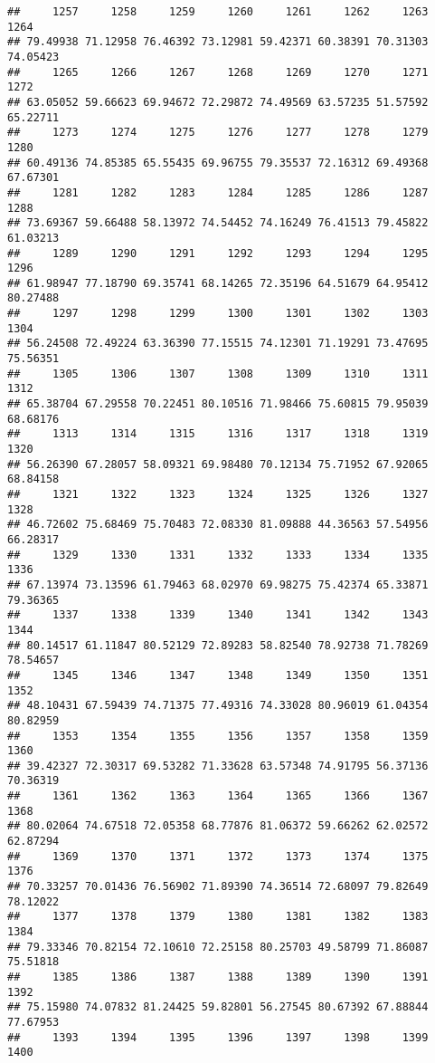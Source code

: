 \documentclass[
]{article}
\begin{document}
\begin{verbatim}
##     1257     1258     1259     1260     1261     1262     1263     1264 
## 79.49938 71.12958 76.46392 73.12981 59.42371 60.38391 70.31303 74.05423 
##     1265     1266     1267     1268     1269     1270     1271     1272 
## 63.05052 59.66623 69.94672 72.29872 74.49569 63.57235 51.57592 65.22711 
##     1273     1274     1275     1276     1277     1278     1279     1280 
## 60.49136 74.85385 65.55435 69.96755 79.35537 72.16312 69.49368 67.67301 
##     1281     1282     1283     1284     1285     1286     1287     1288 
## 73.69367 59.66488 58.13972 74.54452 74.16249 76.41513 79.45822 61.03213 
##     1289     1290     1291     1292     1293     1294     1295     1296 
## 61.98947 77.18790 69.35741 68.14265 72.35196 64.51679 64.95412 80.27488 
##     1297     1298     1299     1300     1301     1302     1303     1304 
## 56.24508 72.49224 63.36390 77.15515 74.12301 71.19291 73.47695 75.56351 
##     1305     1306     1307     1308     1309     1310     1311     1312 
## 65.38704 67.29558 70.22451 80.10516 71.98466 75.60815 79.95039 68.68176 
##     1313     1314     1315     1316     1317     1318     1319     1320 
## 56.26390 67.28057 58.09321 69.98480 70.12134 75.71952 67.92065 68.84158 
##     1321     1322     1323     1324     1325     1326     1327     1328 
## 46.72602 75.68469 75.70483 72.08330 81.09888 44.36563 57.54956 66.28317 
##     1329     1330     1331     1332     1333     1334     1335     1336 
## 67.13974 73.13596 61.79463 68.02970 69.98275 75.42374 65.33871 79.36365 
##     1337     1338     1339     1340     1341     1342     1343     1344 
## 80.14517 61.11847 80.52129 72.89283 58.82540 78.92738 71.78269 78.54657 
##     1345     1346     1347     1348     1349     1350     1351     1352 
## 48.10431 67.59439 74.71375 77.49316 74.33028 80.96019 61.04354 80.82959 
##     1353     1354     1355     1356     1357     1358     1359     1360 
## 39.42327 72.30317 69.53282 71.33628 63.57348 74.91795 56.37136 70.36319 
##     1361     1362     1363     1364     1365     1366     1367     1368 
## 80.02064 74.67518 72.05358 68.77876 81.06372 59.66262 62.02572 62.87294 
##     1369     1370     1371     1372     1373     1374     1375     1376 
## 70.33257 70.01436 76.56902 71.89390 74.36514 72.68097 79.82649 78.12022 
##     1377     1378     1379     1380     1381     1382     1383     1384 
## 79.33346 70.82154 72.10610 72.25158 80.25703 49.58799 71.86087 75.51818 
##     1385     1386     1387     1388     1389     1390     1391     1392 
## 75.15980 74.07832 81.24425 59.82801 56.27545 80.67392 67.88844 77.67953 
##     1393     1394     1395     1396     1397     1398     1399     1400 

\end{verbatim}
\end{document}
